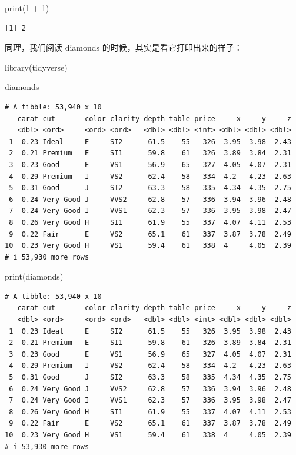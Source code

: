 \documentclass[
  letterpaper,
]{ctexbook}
\newenvironment{Shaded}{\begin{snugshade}}{\end{snugshade}}
\newcommand{\DecValTok}[1]{\textcolor[rgb]{0.68,0.00,0.00}{#1}}
\newcommand{\FunctionTok}[1]{\textcolor[rgb]{0.28,0.35,0.67}{#1}}
\newcommand{\NormalTok}[1]{\textcolor[rgb]{0.00,0.23,0.31}{#1}}
\newcommand{\SpecialCharTok}[1]{\textcolor[rgb]{0.37,0.37,0.37}{#1}}
\begin{document}
\begin{Shaded}
\begin{Highlighting}[]
\FunctionTok{print}\NormalTok{(}\DecValTok{1} \SpecialCharTok{+} \DecValTok{1}\NormalTok{)}
\end{Highlighting}
\end{Shaded}

\begin{verbatim}
[1] 2
\end{verbatim}

同理，我们阅读 diamonds 的时候，其实是看它打印出来的样子：

\begin{Shaded}
\begin{Highlighting}[]
\FunctionTok{library}\NormalTok{(tidyverse)}

\NormalTok{diamonds}
\end{Highlighting}
\end{Shaded}

\begin{verbatim}
# A tibble: 53,940 x 10
   carat cut       color clarity depth table price     x     y     z
   <dbl> <ord>     <ord> <ord>   <dbl> <dbl> <int> <dbl> <dbl> <dbl>
 1  0.23 Ideal     E     SI2      61.5    55   326  3.95  3.98  2.43
 2  0.21 Premium   E     SI1      59.8    61   326  3.89  3.84  2.31
 3  0.23 Good      E     VS1      56.9    65   327  4.05  4.07  2.31
 4  0.29 Premium   I     VS2      62.4    58   334  4.2   4.23  2.63
 5  0.31 Good      J     SI2      63.3    58   335  4.34  4.35  2.75
 6  0.24 Very Good J     VVS2     62.8    57   336  3.94  3.96  2.48
 7  0.24 Very Good I     VVS1     62.3    57   336  3.95  3.98  2.47
 8  0.26 Very Good H     SI1      61.9    55   337  4.07  4.11  2.53
 9  0.22 Fair      E     VS2      65.1    61   337  3.87  3.78  2.49
10  0.23 Very Good H     VS1      59.4    61   338  4     4.05  2.39
# i 53,930 more rows
\end{verbatim}

\begin{Shaded}
\begin{Highlighting}[]
\FunctionTok{print}\NormalTok{(diamonds)}
\end{Highlighting}
\end{Shaded}

\begin{verbatim}
# A tibble: 53,940 x 10
   carat cut       color clarity depth table price     x     y     z
   <dbl> <ord>     <ord> <ord>   <dbl> <dbl> <int> <dbl> <dbl> <dbl>
 1  0.23 Ideal     E     SI2      61.5    55   326  3.95  3.98  2.43
 2  0.21 Premium   E     SI1      59.8    61   326  3.89  3.84  2.31
 3  0.23 Good      E     VS1      56.9    65   327  4.05  4.07  2.31
 4  0.29 Premium   I     VS2      62.4    58   334  4.2   4.23  2.63
 5  0.31 Good      J     SI2      63.3    58   335  4.34  4.35  2.75
 6  0.24 Very Good J     VVS2     62.8    57   336  3.94  3.96  2.48
 7  0.24 Very Good I     VVS1     62.3    57   336  3.95  3.98  2.47
 8  0.26 Very Good H     SI1      61.9    55   337  4.07  4.11  2.53
 9  0.22 Fair      E     VS2      65.1    61   337  3.87  3.78  2.49
10  0.23 Very Good H     VS1      59.4    61   338  4     4.05  2.39
# i 53,930 more rows
\end{verbatim}
\end{document}
